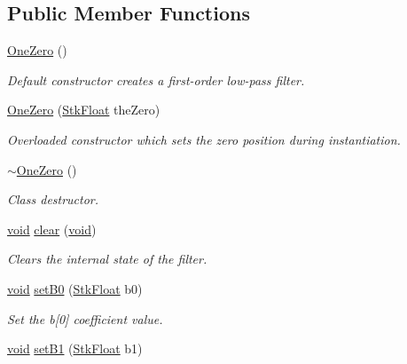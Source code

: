 \subsection*{Public Member Functions}
\begin{DoxyCompactItemize}
\item 
\hyperlink{class_nyq_1_1_one_zero_adc174809a2855eda989d2ac2e3926cd9}{One\+Zero} ()
\begin{DoxyCompactList}\small\item\em Default constructor creates a first-\/order low-\/pass filter. \end{DoxyCompactList}\item 
\hyperlink{class_nyq_1_1_one_zero_aa8273987b31350fa69f6e56b01b3006a}{One\+Zero} (\hyperlink{namespace_nyq_a044fa20a706520a617bbbf458a7db7e4}{Stk\+Float} the\+Zero)
\begin{DoxyCompactList}\small\item\em Overloaded constructor which sets the zero position during instantiation. \end{DoxyCompactList}\item 
\hyperlink{class_nyq_1_1_one_zero_af738a37676b5b685c395ae82ff5e145a}{$\sim$\+One\+Zero} ()
\begin{DoxyCompactList}\small\item\em Class destructor. \end{DoxyCompactList}\item 
\hyperlink{sound_8c_ae35f5844602719cf66324f4de2a658b3}{void} \hyperlink{class_nyq_1_1_one_zero_aae6bcad669fa16dd3f4fd669f364ba3c}{clear} (\hyperlink{sound_8c_ae35f5844602719cf66324f4de2a658b3}{void})
\begin{DoxyCompactList}\small\item\em Clears the internal state of the filter. \end{DoxyCompactList}\item 
\hyperlink{sound_8c_ae35f5844602719cf66324f4de2a658b3}{void} \hyperlink{class_nyq_1_1_one_zero_a53cc85519aecb6e71a321e624609de59}{set\+B0} (\hyperlink{namespace_nyq_a044fa20a706520a617bbbf458a7db7e4}{Stk\+Float} b0)
\begin{DoxyCompactList}\small\item\em Set the b\mbox{[}0\mbox{]} coefficient value. \end{DoxyCompactList}\item 
\hyperlink{sound_8c_ae35f5844602719cf66324f4de2a658b3}{void} \hyperlink{class_nyq_1_1_one_zero_a2bea42fa74adc67371d9c0b55970b2f2}{set\+B1} (\hyperlink{namespace_nyq_a044fa20a706520a617bbbf458a7db7e4}{Stk\+Float} b1)

\end{DoxyCompactItemize}
